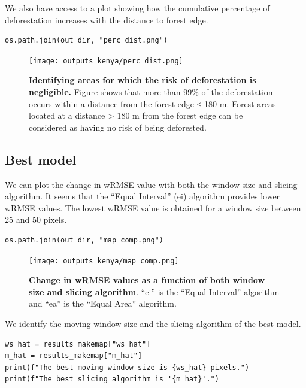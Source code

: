 \documentclass[paper=a4, 12pt, DIV=12]{scrartcl}
\begin{document}
We also have access to a plot showing how the cumulative percentage of deforestation increases with the distance to forest edge.

\begin{verbatim}
os.path.join(out_dir, "perc_dist.png")
\end{verbatim}

\begin{figure}[H]
\centering
\texttt{[image: outputs\_kenya/perc\_dist.png]}
\caption{\label{fig:org77c5a1c}\textbf{Identifying areas for which the risk of deforestation is negligible.} Figure shows that more than 99\% of the deforestation occurs within a distance from the forest edge ≤ 180 m. Forest areas located at a distance > 180 m from the forest edge can be considered as having no risk of being deforested.}
\end{figure}

\subsection{Best model}
\label{sec:orga10423d}

We can plot the change in wRMSE value with both the window size and slicing algorithm. It seems that the ``Equal Interval'' (ei) algorithm provides lower wRMSE values. The lowest wRMSE value is obtained for a window size between 25 and 50 pixels.

\begin{verbatim}
os.path.join(out_dir, "map_comp.png")
\end{verbatim}

\begin{figure}[H]
\centering
\texttt{[image: outputs\_kenya/map\_comp.png]}
\caption{\label{fig:org834d205}\textbf{Change in wRMSE values as a function of both window size and slicing algorithm}. ``ei'' is the ``Equal Interval'' algorithm and ``ea'' is the ``Equal Area'' algorithm.}
\end{figure}

We identify the moving window size and the slicing algorithm of the best model.

\begin{verbatim}
ws_hat = results_makemap["ws_hat"]
m_hat = results_makemap["m_hat"]
print(f"The best moving window size is {ws_hat} pixels.")
print(f"The best slicing algorithm is '{m_hat}'.")
\end{verbatim}
\end{document}
